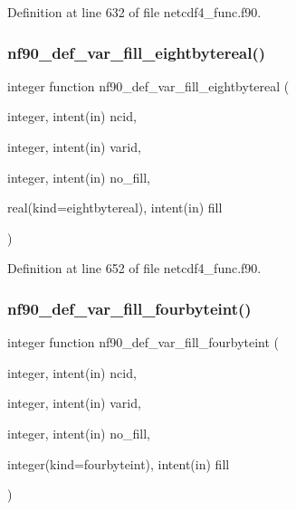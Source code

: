 Definition at line 632 of file netcdf4\+\_\+func.\+f90.

\mbox{\label{netcdf4__func_8f90_adf5a715c6c4eef95d806824e07bd2e86}} 
\subsubsection{\texorpdfstring{nf90\+\_\+def\+\_\+var\+\_\+fill\+\_\+eightbytereal()}{nf90\_def\_var\_fill\_eightbytereal()}}
{\footnotesize\ttfamily integer function nf90\+\_\+def\+\_\+var\+\_\+fill\+\_\+eightbytereal (\begin{DoxyParamCaption}\item[{integer, intent(in)}]{ncid,  }\item[{integer, intent(in)}]{varid,  }\item[{integer, intent(in)}]{no\+\_\+fill,  }\item[{real(kind=eightbytereal), intent(in)}]{fill }\end{DoxyParamCaption})}



Definition at line 652 of file netcdf4\+\_\+func.\+f90.

\mbox{\label{netcdf4__func_8f90_a889ae889df8027ac63ac9fbe0099ac93}} 
\subsubsection{\texorpdfstring{nf90\+\_\+def\+\_\+var\+\_\+fill\+\_\+fourbyteint()}{nf90\_def\_var\_fill\_fourbyteint()}}
{\footnotesize\ttfamily integer function nf90\+\_\+def\+\_\+var\+\_\+fill\+\_\+fourbyteint (\begin{DoxyParamCaption}\item[{integer, intent(in)}]{ncid,  }\item[{integer, intent(in)}]{varid,  }\item[{integer, intent(in)}]{no\+\_\+fill,  }\item[{integer(kind=fourbyteint), intent(in)}]{fill }\end{DoxyParamCaption})}



